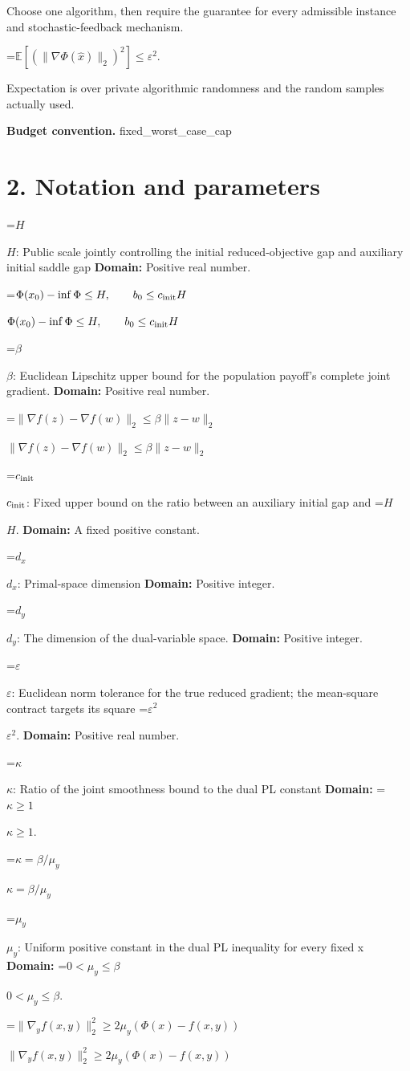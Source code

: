 \documentclass[10pt,a4paper]{article}
\newcommand{\AtlasMath}[1]{\par\begingroup\centering\setbox0=\hbox{$\displaystyle #1$}\ifdim\wd0>1.4\linewidth\typeout{ATLAS WIDE FORMULA: \the\wd0}\fi\ifdim\wd0>\linewidth\resizebox{\linewidth}{!}{\box0}\else\box0\fi\par\endgroup}
\newcommand{\AtlasInlineMath}[1]{\begingroup\setbox0=\hbox{$#1$}\ifdim\wd0>.4\linewidth\endgroup\AtlasMath{#1}\else\endgroup$#1$\fi}
\begin{document}
Choose one algorithm, then require the guarantee for every admissible instance and stochastic-feedback mechanism.


\AtlasMath{\mathbb{E}\!\left[\left(\|\nabla\Phi(\widehat{x})\|_2\right)^2\right]\le\varepsilon^2.}


Expectation is over private algorithmic randomness and the random samples actually used.

\textbf{Budget convention.} fixed\_worst\_case\_cap

\section{2. Notation and parameters}
\AtlasInlineMath{H}: Public scale jointly controlling the initial reduced-objective gap and auxiliary initial saddle gap \textbf{Domain:} Positive real number.

\AtlasInlineMath{\Phi(x_0)-\inf\Phi\le H,\qquad b_0\le c_{\rm init}H}

\AtlasInlineMath{\beta}: Euclidean Lipschitz upper bound for the population payoff's complete joint gradient. \textbf{Domain:} Positive real number.

\AtlasInlineMath{\|\nabla f(z)-\nabla f(w)\|_2\le\beta\|z-w\|_2}

\AtlasInlineMath{c_{\rm init}}: Fixed upper bound on the ratio between an auxiliary initial gap and \AtlasInlineMath{H}. \textbf{Domain:} A fixed positive constant.

\AtlasInlineMath{d_x}: Primal-space dimension \textbf{Domain:} Positive integer.

\AtlasInlineMath{d_y}: The dimension of the dual-variable space. \textbf{Domain:} Positive integer.

\AtlasInlineMath{\varepsilon}: Euclidean norm tolerance for the true reduced gradient; the mean-square contract targets its square \AtlasInlineMath{\varepsilon^2}. \textbf{Domain:} Positive real number.

\AtlasInlineMath{\kappa}: Ratio of the joint smoothness bound to the dual PL constant \textbf{Domain:} \AtlasInlineMath{\kappa\ge1}.

\AtlasInlineMath{\kappa=\beta/\mu_y}

\AtlasInlineMath{\mu_y}: Uniform positive constant in the dual PL inequality for every fixed x \textbf{Domain:} \AtlasInlineMath{0<\mu_y\le\beta}.

\AtlasInlineMath{\|\nabla_yf(x,y)\|_2^2\ge2\mu_y(\Phi(x)-f(x,y))}
\end{document}
